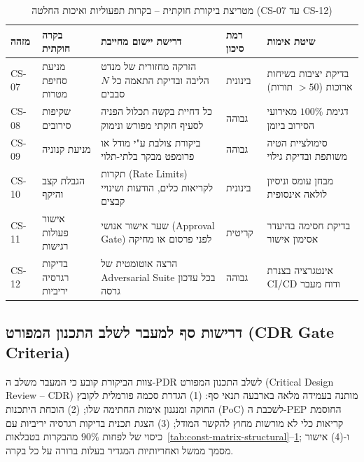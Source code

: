 \begin{table}[htbp]
\centering
\caption{מטריצת ביקורת חוקתית -- בקרות תפעוליות ואיכות החלטה (\textenglish{CS-07} עד \textenglish{CS-12})}
\label{tab:const-matrix-operational}
\begin{tabular}{p{1.3cm} p{3.0cm} p{4.2cm} p{2.2cm} p{3.6cm}}
\toprule
\textbf{מזהה} & \textbf{בקרה חוקתית} & \textbf{דרישת יישום מחייבת} & \textbf{רמת סיכון} & \textbf{שיטת אימות} \\
\midrule
\textenglish{CS-07} & מניעת סחיפת מטרות & הזרקה מחזורית של מנדט הליבה ובדיקת התאמה כל $N$ סבבים & בינונית & בדיקת יציבות בשיחות ארוכות ($>50$ תורות) \\
\textenglish{CS-08} & שקיפות סירובים & כל דחיית בקשה תכלול הפניה לסעיף חוקתי מפורש ונימוק & גבוהה & דגימת $100\%$ מאירועי הסירוב ביומן \\
\textenglish{CS-09} & מניעת קנוניה & ביקורת צולבת ע"י מודל או פרומפט מבקר בלתי-תלוי & גבוהה & סימולציית הטיה משותפת ובדיקת גילוי \\
\textenglish{CS-10} & הגבלת קצב והיקף & תקרות (\textenglish{Rate Limits}) לקריאות כלים, הודעות ושינויי קבצים & בינונית & מבחן עומס וניסיון לולאה אינסופית \\
\textenglish{CS-11} & אישור פעולות רגישות & שער אישור אנושי (\textenglish{Approval Gate}) לפני פרסום או מחיקה & קריטית & בדיקת חסימה בהיעדר אסימון אישור \\
\textenglish{CS-12} & בדיקות רגרסיה יריביות & הרצה אוטומטית של \textenglish{Adversarial Suite} בכל עדכון גרסה & גבוהה & אינטגרציה בצנרת \textenglish{CI/CD} ודוח מעבר \\
\bottomrule
\end{tabular}
\end{table}

\subsection{דרישות סף למעבר לשלב התכנון המפורט (\textenglish{CDR Gate Criteria})}
צוות הביקורת קובע כי המעבר משלב ה-\textenglish{PDR} לשלב התכנון המפורט (\textenglish{Critical Design Review -- CDR}) מותנה בעמידה מלאה בארבעה תנאי סף: (1) הגדרת סכמה פורמלית לקובץ החוקה ומנגנון אימות החתימה שלו; (2) הוכחת היתכנות (\textenglish{PoC}) לשכבת ה-\textenglish{PEP} החוסמת קריאות כלי לא מורשות מחוץ להקשר המודל; (3) הצגת תכנית בדיקות רגרסיה יריביות עם כיסוי של לפחות $90\%$ מהבקרות בטבלאות~\ref{tab:const-matrix-structural}--\ref{tab:const-matrix-operational}; ו-(4) אישור מסמך ממשל ואחריותיות המגדיר בעלות ברורה על כל בקרה.

